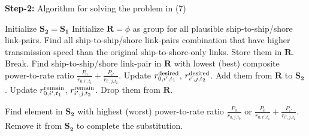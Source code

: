 \documentclass[journal]{IEEEtran}
\begin{document}
 
 \begin{algorithm}[ht]
 \caption{\textbf{Step-2:} Algorithm for solving the problem in (7)}
 \begin{algorithmic}[1]
 \STATE Initialize ${{\mathbf{S}}_{\mathbf{2}}}={{\mathbf{S}}_{\mathbf{1}}}$
 \STATE Initialize ${\mathbf{R}} = \phi $ as group for all plausible ship-to-ship/shore link-pairs.
 \STATE Find all ship-to-ship/shore link-pairs combination that have higher transmission speed than the original ship-to-shore-only links. Store them in ${\mathbf{R}}$.
    \STATE Break.
   \ENDIF
   \STATE Find ship-to-ship/shore link-pair in ${\mathbf{R}}$ with lowest (best) composite power-to-rate ratio $ {\frac{{{P_0}}}{{{r_{0,i',{t_1}}}}} + \frac{{{P_{i'}}}}{{{r_{i',j,{t_2}}}}}} $. 
   \STATE Update $r_{0,i',{t_1}}^{\rm{desired}}$, $r_{i',j,{t_2}}^{\rm{desired}}$.
    \STATE Add them from ${\mathbf{R}}$ to ${{\mathbf{S}}_{\mathbf{2}}}$.
    \STATE Update $r_{0,i',{t_1}}^{\rm{remain}}$, $r_{i',j,{t_2}}^{\rm{remain}}$.
   \ELSE
   \STATE Drop them from ${\mathbf{R}}$. 
   \ENDIF
   \ENDWHILE
 \ENDFOR

   \STATE Find element in ${{\mathbf{S}}_{\mathbf{2}}}$ with highest (worst) power-to-rate ratio ${\frac{P_0}{r_{0,j,{t_0}}}}$ or $ {\frac{{{P_0}}}{{{r_{0,i',{t_1}}}}} + \frac{{{P_{i'}}}}{{{r_{i',j,{t_2}}}}}} $. 
   \STATE Remove it from ${{\mathbf{S}}_{\mathbf{2}}}$ to complete the substitution. 
   
 \ENDWHILE
 \end{algorithmic}
 \end{algorithm}
 
\end{document}
